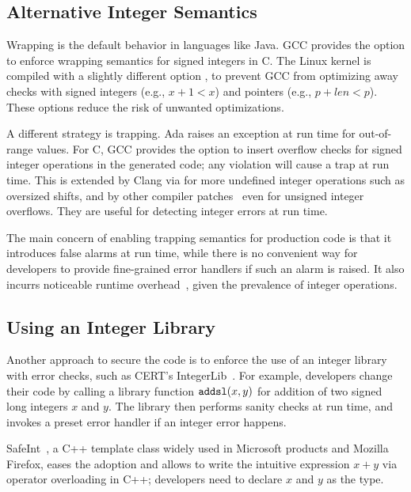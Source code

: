 \subsection{Alternative Integer Semantics}

Wrapping is the default behavior in languages like Java.
GCC provides the option  to enforce wrapping semantics
for signed integers in C.  The Linux kernel is compiled with a
slightly different option , to prevent GCC
from optimizing away checks with signed integers (e.g., $x + 1 <
x$) and pointers (e.g., $p + \mathit{len} < p$).
These options reduce the risk of unwanted optimizations.

A different strategy is trapping.  Ada raises an exception at run
time for out-of-range values.  For C, GCC provides the option
 to insert overflow checks for signed integer operations
in the generated code; any violation will cause a trap at run time.
This is extended by Clang via  for
more undefined integer operations such as oversized shifts, and by
other compiler patches~\cite{brumley:rich, ioc} even for unsigned
integer overflows.  They are useful for detecting integer errors
at run time.

The main concern of enabling trapping semantics for production code
is that it introduces false alarms at run time, while there is no
convenient way for developers to provide fine-grained error handlers
if such an alarm is raised.  It also incurrs noticeable runtime
overhead~\cite{ioc}, given the prevalence of integer operations.

\subsection{Using an Integer Library}

Another approach to secure the code is to enforce the use of an integer
library with error checks, such as CERT's
IntegerLib~\cite[INT03-C]{seacord:secure-c}.  For example, developers
change their code by calling a library function $\texttt{addsl}(x, y)$
for addition of two signed long integers $x$ and $y$.  The library
then performs sanity checks at run time, and invokes a preset error
handler if an integer error happens.

SafeInt~\cite{safeint}, a C++ template class widely used in Microsoft
products and Mozilla Firefox, eases the adoption and allows to write
the intuitive expression $x + y$ via operator overloading in C++;
developers need to declare $x$ and $y$ as the 
type.

